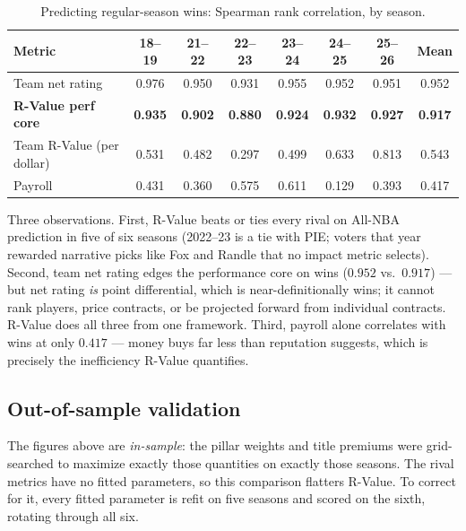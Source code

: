 \documentclass[11pt]{article}
\begin{document}
\begin{table}[h]\centering
\caption{Predicting regular-season wins: Spearman rank correlation, by season.}
\small
\begin{tabular}{lccccccc}
\toprule
Metric & 18--19 & 21--22 & 22--23 & 23--24 & 24--25 & 25--26 & Mean \\
\midrule
Team net rating            & 0.976 & 0.950 & 0.931 & 0.955 & 0.952 & 0.951 & 0.952 \\
\textbf{R-Value perf core} & \textbf{0.935} & \textbf{0.902} & \textbf{0.880} & \textbf{0.924} & \textbf{0.932} & \textbf{0.927} & \textbf{0.917} \\
Team R-Value (per dollar)  & 0.531 & 0.482 & 0.297 & 0.499 & 0.633 & 0.813 & 0.543 \\
Payroll                    & 0.431 & 0.360 & 0.575 & 0.611 & 0.129 & 0.393 & 0.417 \\
\bottomrule
\end{tabular}
\end{table}

Three observations. First, R-Value beats or ties every rival on All-NBA
prediction in five of six seasons (2022--23 is a tie with PIE; voters that
year rewarded narrative picks like Fox and Randle that no impact metric
selects). Second, team net rating edges the performance core on wins ($0.952$
vs.\ $0.917$) --- but net rating \emph{is} point differential, which is
near-definitionally wins; it cannot rank players, price contracts, or be
projected forward from individual contracts. R-Value does all three from one
framework. Third, payroll alone correlates with wins at only $0.417$ ---
money buys far less than reputation suggests, which is precisely the
inefficiency R-Value quantifies.

\subsection{Out-of-sample validation}
\label{sec:cv}

The figures above are \emph{in-sample}: the pillar weights and title premiums
were grid-searched to maximize exactly those quantities on exactly those
seasons. The rival metrics have no fitted parameters, so this comparison
flatters R-Value. To correct for it, every fitted parameter is refit on five
seasons and scored on the sixth, rotating through all six.
\end{document}
